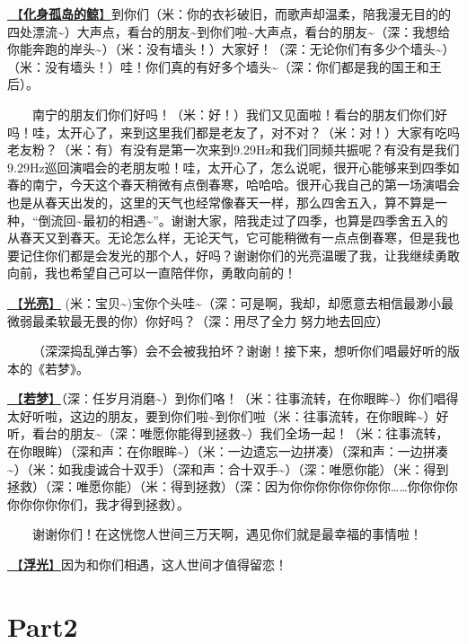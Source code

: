 \documentclass[]{ctexbook}
\begin{document}
\hyperref[hua-shen-gu-dao-de-jing]{🎵【\textbf{化身孤岛的鲸}】}到你们（米：你的衣衫破旧，而歌声却温柔，陪我漫无目的的四处漂流\textasciitilde）大声点，看台的朋友\textasciitilde 到你们啦\textasciitilde 大声点，看台的朋友\textasciitilde（深：我想给你能奔跑的岸头\textasciitilde）（米：没有墙头！）大家好！（深：无论你们有多少个墙头\textasciitilde）（米：没有墙头！）哇！你们真的有好多个墙头\textasciitilde（深：你们都是我的国王和王后）。

  南宁的朋友们你们好吗！（米：好！）我们又见面啦！看台的朋友们你们好吗！哇，太开心了，来到这里我们都是老友了，对不对？（米：对！）大家有吃吗老友粉？（米：有）有没有是第一次来到9.29Hz和我们同频共振呢？有没有是我们9.29Hz巡回演唱会的老朋友啦！哇，太开心了，怎么说呢，很开心能够来到四季如春的南宁，今天这个春天稍微有点倒春寒，哈哈哈。很开心我自己的第一场演唱会也是从春天出发的，这里的天气也经常像春天一样，那么四舍五入，算不算是一种，``倒流回\textasciitilde 最初的相遇\textasciitilde{}''。谢谢大家，陪我走过了四季，也算是四季舍五入的从春天又到春天。无论怎么样，无论天气，它可能稍微有一点点倒春寒，但是我也要记住你们都是会发光的那个人，好吗？谢谢你们的光亮温暖了我，让我继续勇敢向前，我也希望自己可以一直陪伴你，勇敢向前的！

\hyperref[silver-linings]{🎵【\textbf{光亮}】} (米：宝贝\textasciitilde)宝你个头哇\textasciitilde（深：可是啊，我却，却愿意去相信最渺小最微弱最柔软最无畏的你）你好吗？（深：用尽了全力 努力地去回应）

  （深深捣乱弹古筝）会不会被我拍坏？谢谢！接下来，想听你们唱最好听的版本的《若梦》。

\hyperref[ruomeng]{🎵【\textbf{若梦}】}（深：任岁月消磨\textasciitilde）到你们咯！（米：往事流转，在你眼眸\textasciitilde）你们唱得太好听啦，这边的朋友，要到你们啦\textasciitilde 到你们啦（米：往事流转，在你眼眸\textasciitilde）好听，看台的朋友\textasciitilde（深：唯愿你能得到拯救\textasciitilde）我们全场一起！（米：往事流转，在你眼眸）（深和声：在你眼眸\textasciitilde）（米：一边遗忘一边拼凑）（深和声：一边拼凑\textasciitilde）（米：如我虔诚合十双手）（深和声：合十双手\textasciitilde）（深：唯愿你能）（米：得到拯救）（深：唯愿你能）（米：得到拯救）（深：因为你你你你你你你你\ldots\ldots 你你你你你你你你你们，我才得到拯救）。

  谢谢你们！在这恍惚人世间三万天啊，遇见你们就是最幸福的事情啦！

\hyperref[floating-light]{🎵【\textbf{浮光}】}因为和你们相遇，这人世间才值得留恋！

\section{Part2}\label{nanning-20241206-part2}
\end{document}
